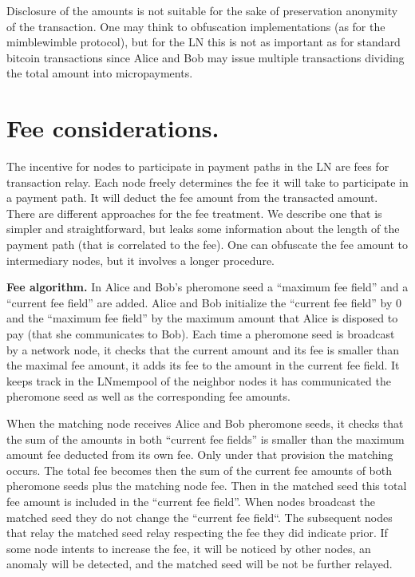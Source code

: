\documentclass[12pt]{amsart}
\theoremstyle{remark}
\begin{document}
\medskip

Disclosure of the amounts is not suitable for the sake of preservation anonymity of the transaction. One may 
think to obfuscation implementations (as for the mimblewimble protocol), but for the LN this is not as important as for 
standard bitcoin transactions since Alice and Bob may issue multiple transactions dividing the total amount
into micropayments.



\section{Fee considerations.}\label{sec_fees}


The incentive for nodes to participate in payment paths in the LN are fees for transaction relay. Each node
freely determines the fee it will take to participate in a payment path. It will deduct the fee amount from the 
transacted amount. 
There are different approaches for the fee treatment. We describe one that  is simpler and straightforward, 
but leaks some 
information about the length of the payment path (that is correlated to the fee). One can
obfuscate the fee amount to intermediary nodes, but it involves a longer procedure.

\medskip

\textbf{Fee algorithm.}
In Alice and Bob's pheromone seed a ``maximum fee field'' and a ``current fee field'' are added. 
Alice and Bob initialize the ``current fee field'' by $0$ and the ``maximum fee field'' by  
the maximum amount that Alice is disposed to pay (that she communicates to Bob). 
Each time a pheromone seed is broadcast by a network node, it checks 
that the current amount and its fee is smaller than the maximal fee amount, it adds its fee to the amount 
in the current fee field. It keeps track in the LNmempool of the neighbor nodes it has communicated the pheromone
seed as well as the corresponding fee amounts. 

\medskip

When the matching node receives Alice and Bob pheromone seeds, it checks that the sum of the amounts in both 
``current fee fields'' is smaller than the maximum amount fee deducted from its own fee. Only under that 
provision the matching occurs. The total fee becomes then the sum of the current fee amounts 
of both pheromone seeds plus 
the matching node fee. Then in the matched seed this total fee amount is included in the ``current fee field''. 
When nodes broadcast the matched seed they do not change the ``current fee field``. The 
subsequent nodes that relay the matched seed relay respecting the fee they did indicate prior. If some node 
intents to increase the fee, it will be noticed by other nodes, an anomaly will be detected, 
and the matched seed will be not be further relayed.
\end{document}
